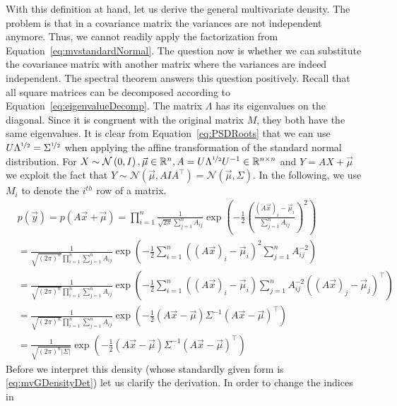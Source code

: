 \documentclass[a4paper,11pt,leqno]{report}\usepackage[]{graphicx}\usepackage[]{color}
\newcommand{\N}[2]{\mathcal{N}\left( #1, #2 \right)}
\begin{document}
With this definition at hand, let us derive the general multivariate density. The problem is that in a covariance matrix the variances are not independent anymore.
Thus, we cannot readily apply the factorization from Equation~\eqref{eq:mvstandardNormal}. The question now is whether we can substitute the covariance matrix with
another matrix where the variances are indeed independent. The spectral theorem answers this question positively. Recall that all square matrices can be decomposed
according to Equation~\eqref{eq:eigenvalueDecomp}. The matrix $ \Lambda $ has its eigenvalues on the diagonal. Since it is congruent with the original matrix $ M $,
they both have the same eigenvalues. It is clear from Equation~\eqref{eq:PSDRoots} that we can use $ U \Lambda^{\nicefrac{1}{2}} = \Sigma^{\nicefrac{1}{2}} $ when applying the affine transformation of the standard normal distribution.
For $ X \sim \N{0}{I}, \vec{\mu} \in \mathbb{R}^{n}, A = U\Lambda^{\nicefrac{1}{2}}U^{-1} \in \mathbb{R}^{n\times n} $ and $ Y = AX + \vec{\mu} $ we exploit
the fact that $ Y \sim \N{\vec{\mu}}{AIA^{\top}} = \N{\vec{\mu}}{\Sigma} $. In the following, we use $ M_{i} $ to denote the $ i^{th} $ row of a matrix.
\begin{align}
&p(\vec{y}) 
= p(A\vec{x} + \vec{\mu}) = \prod_{i=1}^{n} \frac{1}{\sqrt{2\pi} \sum_{j=1}^{n}A_{ij}} \exp \left(-\frac{1}{2} \left( \frac{(A\vec{x})_{i} - \vec{\mu}_{i}}{\sum_{j=1}^{n}A_{ij}} \right)^{2}  \right) \\
&= \frac{1}{\sqrt{\left( 2\pi \right)^{n}} \prod_{i=1}^{n}\sum_{j=1}^{n}A_{ij}}
\exp \left(-\frac{1}{2} \sum_{i=1}^{n} \left( (A\vec{x})_{i} - \vec{\mu}_{i} \right)^{2} \sum_{j=1}^{n}A_{ij}^{-2} \right) \\
&= \frac{1}{\sqrt{\left( 2\pi \right)^{n}} \prod_{i=1}^{n}\sum_{j=1}^{n}A_{ij}}
\exp \left(-\frac{1}{2} \sum_{i=1}^{n} \left( ( A\vec{x} )_{i} - \vec{\mu}_{i}\right) \sum_{j=1}^{n} A_{ij}^{-2} \left((A\vec{x})_{j} - \vec{\mu}_{j} \right)^{\top} \right) 
\label{eq:quadraticForm} \\
&= \frac{1}{\sqrt{\left( 2\pi \right)^{n}} \prod_{i=1}^{n}\sum_{j=1}^{n}A_{ij}}
\exp \left(-\frac{1}{2} \left( A\vec{x} - \vec{\mu}\right) \Sigma^{-1} \left(A\vec{x} - \vec{\mu} \right)^{\top} \right) \\
&= \frac{1}{\sqrt{\left( 2\pi \right)^{n} |\Sigma|}}
\exp \left(-\frac{1}{2} \left( A\vec{x} - \vec{\mu}\right) \Sigma^{-1} \left(A\vec{x} - \vec{\mu} \right)^{\top} \right) \label{eq:mvGDensityDet}
\end{align}
Before we interpret this density (whose standardly given form is \eqref{eq:mvGDensityDet}) let us clarify the derivation. In order to change the indices in
\end{document}
